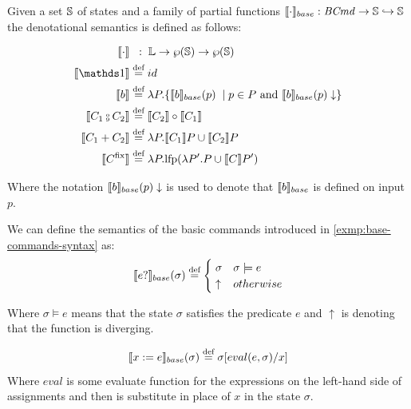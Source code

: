 \documentclass[
  10pt,       %
  twoside,    %
  a4paper,    %
  english,    %
  tikz,       %
  openright,  %
]{book}
\begin{document}
\begin{definition}
  \label{def:deno}
  Given a set $\mathbb{S}$ of states and a family of partial functions
  $\llbracket \cdot \rrbracket_{base} : \mathit{BCmd} \to \mathbb{S} \hookrightarrow \mathbb{S}$ the denotational
  semantics is defined as follows:

  \begin{align*}
      \sem{\cdot}         & \;\;:\; \lang \to \pow{\states} \to \pow{\states} \\
      \sem{\sskip}        &\defeq id \\
      \sem{b}             &\defeq \lambda P . \{ \bsem{b}(p)\; \mid 
      p \in P \mand \bsem{b}(p) \downarrow\} \\
      \sem{C_1 \fcmp C_2} &\defeq \sem{C_2} \circ \sem{C_1} \\
      \sem{C_1 + C_2}     &\defeq \lambda P . \sem{C_1} P \cup \sem{C_2} P \\
      \sem{C^\fix}        &\defeq \lambda P . \lfp(\lambda P'. P \cup \sem{C} P')
  \end{align*}
  
  Where the notation $\llbracket b \rrbracket_{base}(p)\downarrow$ is used to denote that $\llbracket b \rrbracket_{base}$
  is defined on input $p$.
\end{definition}


\begin{example}
  We can define the semantics of the basic commands introduced in 
  \ref{exmp:base-commands-syntax} as:
  $$\llbracket e ? \rrbracket_{base}(\sigma) \stackrel{\text{def}}{=} \begin{cases}
    \; \sigma & \sigma \models e \\
    \; \uparrow & otherwise
  \end{cases}$$

  Where $\sigma \models e$ means that the state $\sigma$ satisfies the 
  predicate $e$ and $\uparrow$ is denoting that the function is diverging.

  $$\llbracket x := e \rrbracket_{base}(\sigma) \stackrel{\text{def}}{=} \sigma[eval(e, \sigma)/x]$$
  Where $eval$ is some evaluate function for the expressions on the left-hand
  side of assignments and then is substitute in place of $x$ in the 
  state $\sigma$.
\end{example}
\end{document}
